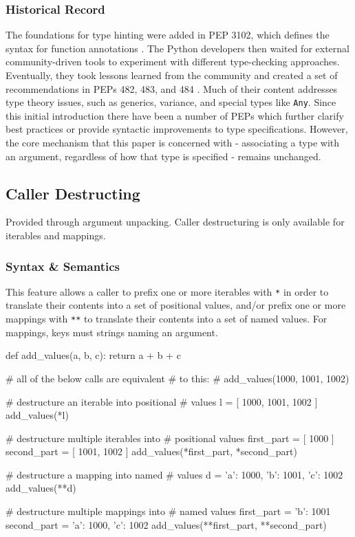 \subsubsection{Historical Record}

The foundations for type hinting were added in PEP 3102, which defines the syntax for
function annotations
\parencite[][peps/pep-3102.rst]{python-peps}.
The Python developers then waited for external community-driven tools to experiment with
different type-checking approaches.
Eventually, they took lessons learned from the community and created a set of
recommendations in PEPs 482, 483, and 484
\parencite[][peps/pep-0484.rst, "Abstract"]{python-peps}.
Much of their content addresses type theory issues, such as generics, variance, and
special types like \texttt{Any}.
Since this initial introduction there have been a number of PEPs which further clarify
best practices or provide syntactic improvements to type specifications.
However, the core mechanism that this paper is concerned with - associating a type with an
argument, regardless of how that type is specified - remains unchanged.

\subsection{Caller Destructing}
Provided through argument unpacking.
Caller destructuring is only available for iterables and mappings.

\subsubsection{Syntax \& Semantics}
This feature allows a caller to prefix one or more iterables with \texttt{*} in order to
translate their contents into a set of positional values, and/or prefix one or more
mappings with \texttt{**} to translate their contents into a set of named values.
For mappings, keys must strings naming an argument.
\parencite[][reference/expressions.html section 6.3.4 "Calls"]{python-doc-html}

\begin{pygmented}[lang=python]
def add_values(a, b, c):
    return a + b + c

# all of the below calls are equivalent
# to this:
# add_values(1000, 1001, 1002)

# destructure an iterable into positional
# values
l = [ 1000, 1001, 1002 ]
add_values(*l)

# destructure multiple iterables into
# positional values
first_part = [ 1000 ]
second_part = [ 1001, 1002 ]
add_values(*first_part, *second_part)

# destructure a mapping into named
# values
d = { 'a': 1000, 'b': 1001, 'c': 1002 }
add_values(**d)

# destructure multiple mappings into
# named values
first_part = { 'b': 1001 }
second_part = { 'a': 1000, 'c': 1002 }
add_values(**first_part, **second_part)
\end{pygmented}


